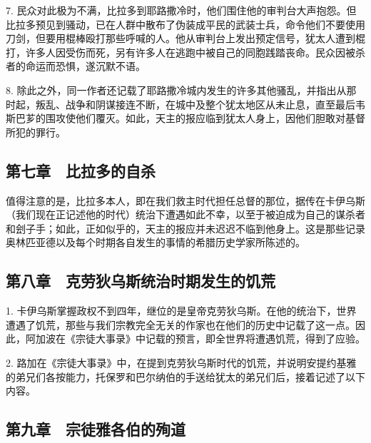 7. 民众对此极为不满，比拉多到耶路撒冷时，他们围住他的审判台大声抱怨。但比拉多预见到骚动，已在人群中散布了伪装成平民的武装士兵，命令他们不要使用刀剑，但要用棍棒殴打那些呼喊的人。他从审判台上发出预定信号，犹太人遭到棍打，许多人因受伤而死，另有许多人在逃跑中被自己的同胞践踏丧命。民众因被杀者的命运而恐惧，遂沉默不语。\par

8. 除此之外，同一作者还记载了耶路撒冷城内发生的许多其他骚乱，并指出从那时起，叛乱、战争和阴谋接连不断，在城中及整个犹太地区从未止息，直至最后韦斯巴芗的围攻使他们覆灭。如此，天主的报应临到犹太人身上，因他们胆敢对基督所犯的罪行。\par


\subsection{第七章　比拉多的自杀}

值得注意的是，比拉多本人，即在我们救主时代担任总督的那位，据传在卡伊乌斯（我们现在正记述他的时代）统治下遭遇如此不幸，以至于被迫成为自己的谋杀者和刽子手；如此，正如似乎的，天主的报应并未迟迟不临到他身上。这是那些记录奥林匹亚德以及每个时期各自发生的事情的希腊历史学家所陈述的。\par


\subsection{第八章　克劳狄乌斯统治时期发生的饥荒}

1. 卡伊乌斯掌握政权不到四年，继位的是皇帝克劳狄乌斯。在他的统治下，世界遭遇了饥荒，那些与我们宗教完全无关的作家也在他们的历史中记载了这一点。因此，阿加波在《宗徒大事录》中记载的预言，即全世界将遭遇饥荒，得到了应验。\par

2. 路加在《宗徒大事录》中，在提到克劳狄乌斯时代的饥荒，并说明安提约基雅的弟兄们各按能力，托保罗和巴尔纳伯的手送给犹太的弟兄们后，接着记述了以下内容。\par


\subsection{第九章　宗徒雅各伯的殉道}

